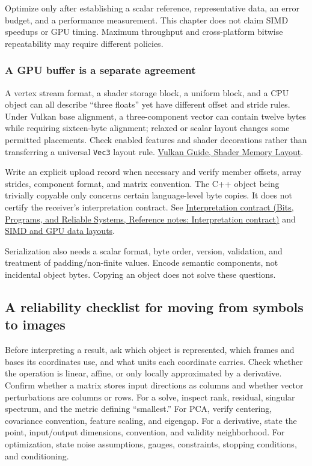 Optimize only after establishing a scalar reference, representative data, an error budget, and a performance measurement. This chapter does not claim SIMD speedups or GPU timing. Maximum throughput and cross-platform bitwise repeatability may require different policies.

\subsubsection{A GPU buffer is a separate agreement}\label{02-foundations-ii-ch037-a-gpu-buffer-is-a-separate-agreement}

A vertex stream format, a shader storage block, a uniform block, and a CPU object can all describe ``three floats'' yet have different offset and stride rules. Under Vulkan base alignment, a three-component vector can contain twelve bytes while requiring sixteen-byte alignment; relaxed or scalar layout changes some permitted placements. Check enabled features and shader decorations rather than transferring a universal \texttt{Vec3} layout rule. \href{https://docs.vulkan.org/guide/latest/shader_memory_layout.html}{Vulkan Guide, Shader Memory Layout}.

Write an explicit upload record when necessary and verify member offsets, array strides, component format, and matrix convention. The C++ object being trivially copyable only concerns certain language-level byte copies. It does not certify the receiver's interpretation contract. See \href{../01-Bits-Programs-and-Reliable-Systems/main.pdf\#nameddest=appendix-f414bd4ed05c}{Interpretation contract (Bits, Programs, and Reliable Systems, Reference notes: Interpretation contract)} and \hyperref[appendix-3c7b1a56de01]{SIMD and GPU data layouts}.

Serialization also needs a scalar format, byte order, version, validation, and treatment of padding/non-finite values. Encode semantic components, not incidental object bytes. Copying an object does not solve these questions.

\subsection{A reliability checklist for moving from symbols to images}\label{02-foundations-ii-ch037-a-reliability-checklist-for-moving-from-symbols-to-images}

Before interpreting a result, ask which object is represented, which frames and bases its coordinates use, and what units each coordinate carries. Check whether the operation is linear, affine, or only locally approximated by a derivative. Confirm whether a matrix stores input directions as columns and whether vector perturbations are columns or rows. For a solve, inspect rank, residual, singular spectrum, and the metric defining ``smallest.'' For PCA, verify centering, covariance convention, feature scaling, and eigengap. For a derivative, state the point, input/output dimensions, convention, and validity neighborhood. For optimization, state noise assumptions, gauges, constraints, stopping conditions, and conditioning.

